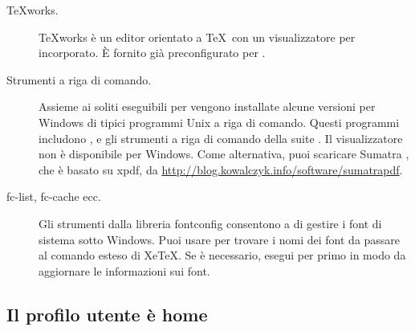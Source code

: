\documentclass{article}
\begin{document}
\begin{description}
\item[TeXworks.] \TeX{}works è un editor orientato a \TeX\ con un
  visualizzatore per  incorporato. È fornito già preconfigurato
  per \TL.

\item[Strumenti a riga di comando.] Assieme ai soliti eseguibili per \TL{}
  vengono installate alcune versioni per Windows di tipici programmi Unix
  a riga di comando. Questi programmi includono ,
   e gli strumenti a riga di comando della suite
  . Il visualizzatore  non è disponibile per
  Windows. Come alternativa, puoi scaricare Sumatra , che è
  basato su xpdf, da \url{http://blog.kowalczyk.info/software/sumatrapdf}.

\item[fc-list, fc-cache ecc.] Gli strumenti dalla libreria fontconfig
  consentono a \XeTeX{} di gestire i font di sistema sotto Windows. Puoi
  usare  per trovare i nomi dei font da passare al comando
  esteso di Xe\TeX {}. Se è necessario, esegui per primo
   in modo da aggiornare le informazioni sui font.

\end{description}


\subsection{Il profilo utente è home}
\label{sec:winhome}
\end{document}
